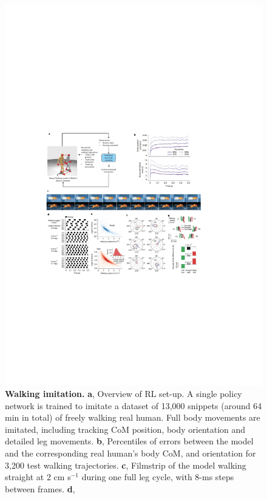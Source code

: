 \documentclass[sn-mathphys-num]{sn-jnl}%
\theoremstyle{thmstyleone}	%
\theoremstyle{thmstyletwo}	%
\theoremstyle{thmstylethree}	%
\begin{document}
\begin{figure}[!htb]
	\centering
	\includegraphics[width=1.0\textwidth]{fig/fig_2.pdf}
	\caption{\textbf{Walking imitation.}
		\textbf{a}, Overview of RL set-up. 
		A single policy network is trained to imitate a dataset of 13,000 snippets (around 64 min in total) of freely walking real human. 
		Full body movements are imitated, including tracking CoM position, body orientation and detailed leg movements.
		\textbf{b}, %
		Percentiles of errors between the model and the corresponding real human's body CoM, and orientation for 3,200 test walking trajectories. 
		\textbf{c}, %
		Filmstrip of the model walking straight at 2 cm s$ ^{-1} $ during one full leg cycle, with 8-ms steps between frames. 
		\textbf{d}, %
}
\end{figure}
\end{document}
